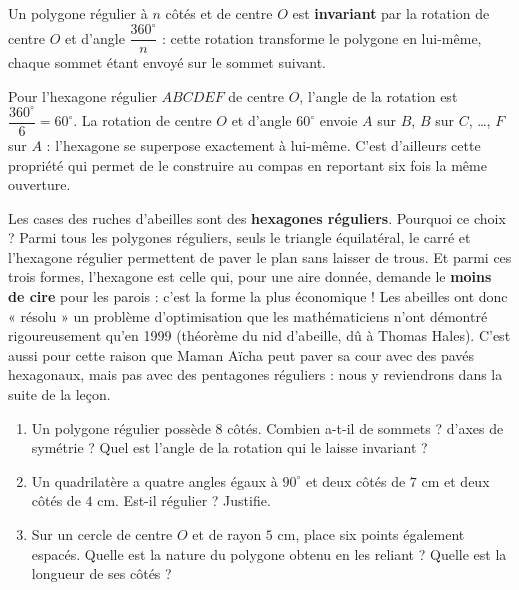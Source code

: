 \documentclass[11pt]{article}
\begin{document}
\begin{propriete}
Un polygone régulier à $n$ côtés et de centre $O$ est \textbf{invariant} par la rotation de centre $O$ et d'angle $\dfrac{360^\circ}{n}$ : cette rotation transforme le polygone en lui-même, chaque sommet étant envoyé sur le sommet suivant.
\end{propriete}

\begin{exemplebox}
Pour l'hexagone régulier $ABCDEF$ de centre $O$, l'angle de la rotation est $\dfrac{360^\circ}{6} = 60^\circ$. La rotation de centre $O$ et d'angle $60^\circ$ envoie $A$ sur $B$, $B$ sur $C$, \dots, $F$ sur $A$ : l'hexagone se superpose exactement à lui-même. C'est d'ailleurs cette propriété qui permet de le construire au compas en reportant six fois la même ouverture.
\end{exemplebox}

\begin{savaistu}
Les cases des ruches d'abeilles sont des \textbf{hexagones réguliers}. Pourquoi ce choix ? Parmi tous les polygones réguliers, seuls le triangle équilatéral, le carré et l'hexagone régulier permettent de paver le plan sans laisser de trous. Et parmi ces trois formes, l'hexagone est celle qui, pour une aire donnée, demande le \textbf{moins de cire} pour les parois : c'est la forme la plus économique ! Les abeilles ont donc « résolu » un problème d'optimisation que les mathématiciens n'ont démontré rigoureusement qu'en 1999 (théorème du nid d'abeille, dû à Thomas Hales). C'est aussi pour cette raison que Maman Aïcha peut paver sa cour avec des pavés hexagonaux, mais pas avec des pentagones réguliers : nous y reviendrons dans la suite de la leçon.
\end{savaistu}

\begin{exercice}
\begin{enumerate}
\item Un polygone régulier possède 8 côtés. Combien a-t-il de sommets ? d'axes de symétrie ? Quel est l'angle de la rotation qui le laisse invariant ?
\item Un quadrilatère a quatre angles égaux à $90^\circ$ et deux côtés de $7$ cm et deux côtés de $4$ cm. Est-il régulier ? Justifie.
\item Sur un cercle de centre $O$ et de rayon $5$ cm, place six points également espacés. Quelle est la nature du polygone obtenu en les reliant ? Quelle est la longueur de ses côtés ?
\end{enumerate}
\end{exercice}
\end{document}
